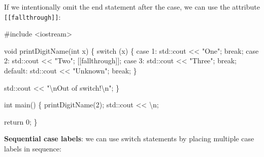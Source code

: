 \documentclass[
  letterpaper,
  DIV=11,
  numbers=noendperiod]{scrreprt}
\newenvironment{Shaded}{\begin{snugshade}}{\end{snugshade}}
\newcommand{\CommentTok}[1]{\textcolor[rgb]{0.37,0.37,0.37}{#1}}
\newcommand{\ControlFlowTok}[1]{\textcolor[rgb]{0.00,0.23,0.31}{#1}}
\newcommand{\DecValTok}[1]{\textcolor[rgb]{0.68,0.00,0.00}{#1}}
\newcommand{\ErrorTok}[1]{\textcolor[rgb]{0.68,0.00,0.00}{#1}}
\newcommand{\FunctionTok}[1]{\textcolor[rgb]{0.28,0.35,0.67}{#1}}
\newcommand{\NormalTok}[1]{\textcolor[rgb]{0.00,0.23,0.31}{#1}}
\newcommand{\SpecialCharTok}[1]{\textcolor[rgb]{0.37,0.37,0.37}{#1}}
\newcommand{\StringTok}[1]{\textcolor[rgb]{0.13,0.47,0.30}{#1}}
\begin{document}
If we intentionally omit the end statement after the case, we can use
the attribute \texttt{{[}{[}fallthrough{]}{]}}:

\begin{Shaded}
\begin{Highlighting}[]
\CommentTok{\#include \textless{}iostream\textgreater{}}

\NormalTok{void }\FunctionTok{printDigitName}\NormalTok{(int x)}
\NormalTok{\{}
    \ControlFlowTok{switch}\NormalTok{ (x)}
\NormalTok{    \{}
\NormalTok{    case }\DecValTok{1}\SpecialCharTok{:}
\NormalTok{        std}\SpecialCharTok{::}\NormalTok{cout }\SpecialCharTok{\textless{}}\ErrorTok{\textless{}} \StringTok{"One"}\NormalTok{;}
        \ControlFlowTok{break}\NormalTok{;}
\NormalTok{    case }\DecValTok{2}\SpecialCharTok{:}
\NormalTok{        std}\SpecialCharTok{::}\NormalTok{cout }\SpecialCharTok{\textless{}}\ErrorTok{\textless{}} \StringTok{"Two"}\NormalTok{;}
\NormalTok{        [[fallthrough]];}
\NormalTok{    case }\DecValTok{3}\SpecialCharTok{:}
\NormalTok{        std}\SpecialCharTok{::}\NormalTok{cout }\SpecialCharTok{\textless{}}\ErrorTok{\textless{}} \StringTok{"Three"}\NormalTok{;}
        \ControlFlowTok{break}\NormalTok{;}
\NormalTok{    default}\SpecialCharTok{:}
\NormalTok{        std}\SpecialCharTok{::}\NormalTok{cout }\SpecialCharTok{\textless{}}\ErrorTok{\textless{}} \StringTok{"Unknown"}\NormalTok{;}
        \ControlFlowTok{break}\NormalTok{;}
\NormalTok{    \}}

\NormalTok{    std}\SpecialCharTok{::}\NormalTok{cout }\SpecialCharTok{\textless{}}\ErrorTok{\textless{}} \StringTok{"}\SpecialCharTok{\textbackslash{}n}\StringTok{Out of switch!}\SpecialCharTok{\textbackslash{}n}\StringTok{"}\NormalTok{;}
\NormalTok{\}}

\NormalTok{int }\FunctionTok{main}\NormalTok{()}
\NormalTok{\{}
    \FunctionTok{printDigitName}\NormalTok{(}\DecValTok{2}\NormalTok{);}
\NormalTok{    std}\SpecialCharTok{::}\NormalTok{cout }\SpecialCharTok{\textless{}}\ErrorTok{\textless{}} \StringTok{\textquotesingle{}}\SpecialCharTok{\textbackslash{}n}\StringTok{\textquotesingle{}}\NormalTok{;}

\NormalTok{    return }\DecValTok{0}\NormalTok{;}
\NormalTok{\}}
\end{Highlighting}
\end{Shaded}

\textbf{Sequential case labels}: we can use switch statements by placing
multiple case labels in sequence:
\end{document}
